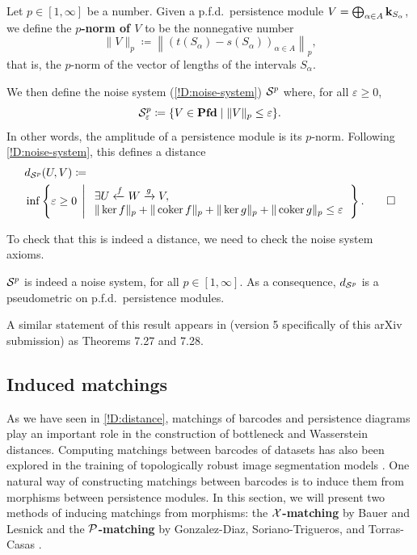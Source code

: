 \begin{definition}
  Let $p \in [1, \infty]$ be a number. Given a p.f.d.\ persistence module $V = \bigoplus_{\alpha \in A} \mathbf{k}_{S_\alpha}$, we define the \textbf{$p$-norm of $V$} to be the nonnegative number
  \[
    \| V \|_p \coloneq \left\| \left(t(S_\alpha) - s(S_\alpha) \right)_{\alpha \in A} \right\|_p,
  \]
  that is, the $p$-norm of the vector of lengths of the intervals $S_\alpha$.
  
  We then define the noise system (\cref{!D:noise-system}) $\mathcal{S}^p$ where, for all $\varepsilon \geq 0$,
  \[
    \mathcal{S}^p_\varepsilon \coloneq \{ V \in \operatorname{\mathbf{Pfd}} \mid \| V \|_p \leq \varepsilon\}.
  \]
  In other words, the amplitude of a persistence module is its $p$-norm. Following \cref{!D:noise-system}, this defines a distance
  \begin{align*}
    & d_{\cc{S}^p}(U, V) \coloneq \\
    & \inf \left\{%
      \varepsilon \geq 0
      \; \left| \; \begin{array}{l}
      \exists U \xleftarrow{f} W \xrightarrow{g} V, \\
      \| \ker f \|_p + \| \coker f \|_p + \| \ker g \|_p + \| \coker g \|_p \leq \varepsilon
      \end{array} \right.
    \right\}.
    \qedhere
  \end{align*}
\end{definition}

To check that this is indeed a distance, we need to check the noise system axioms.

\begin{theorem}
  $\mathcal{S}^p$ is indeed a noise system, for all $p \in [1, \infty]$. As a consequence, $d_{\mathcal{S}^p}$ is a pseudometric on p.f.d.\ persistence modules.
\end{theorem}

A similar statement of this result appears in \cite{SkrabaTurner2023} (version 5 specifically of this arXiv submission) as Theorems 7.27 and 7.28.

\subsection{Induced matchings}

As we have seen in \cref{!D:distance}, matchings of barcodes and persistence diagrams play an important role in the construction of bottleneck and Wasserstein distances. Computing matchings between barcodes of datasets has also been explored in the training of topologically robust image segmentation models \cite{SBPB2024,SPSMB2023}. One natural way of constructing matchings between barcodes is to induce them from morphisms between persistence modules. In this section, we will present two methods of inducing matchings from morphisms: the \textbf{$\mathcal{X}$-matching} by Bauer and Lesnick \cite{BauerLesnick2015} and the \textbf{$\mathcal{P}$-matching} by Gonzalez-Diaz, Soriano-Trigueros, and Torras-Casas \cite{GST2025}.

